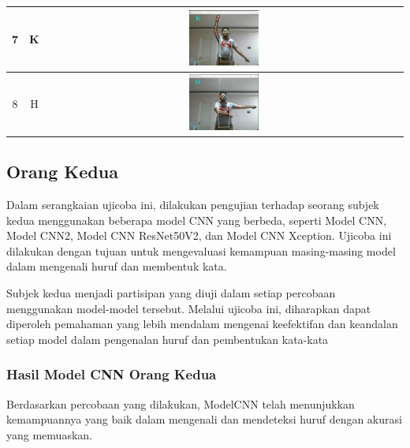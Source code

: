 \begin{table}[h]
\begin{tabular}{|c|c|c|}
			\hline
			7 & K & \includegraphics[width=0.2\textwidth]{gambar/bener/HurufK_ModelCNNXception_Dawe.png} \\
			\hline
			8 & H & \includegraphics[width=0.2\textwidth]{gambar/bener/HurufH_ModelCNNXception_Dawe.png} \\
			\hline
			\end{tabular}
			\end{table}


\subsection{Orang Kedua}

Dalam serangkaian ujicoba ini, dilakukan pengujian terhadap seorang subjek kedua menggunakan beberapa model CNN yang berbeda, seperti Model CNN, Model CNN2, Model CNN ResNet50V2, dan Model CNN Xception. Ujicoba ini dilakukan dengan tujuan untuk mengevaluasi kemampuan masing-masing model dalam mengenali huruf dan membentuk kata.

Subjek kedua menjadi partisipan yang diuji dalam setiap percobaan menggunakan model-model tersebut. Melalui ujicoba ini, diharapkan dapat diperoleh pemahaman yang lebih mendalam mengenai keefektifan dan keandalan setiap model dalam pengenalan huruf dan pembentukan kata-kata

\subsubsection*{Hasil Model CNN Orang Kedua}

Berdasarkan percobaan yang dilakukan, ModelCNN telah menunjukkan kemampuannya yang baik dalam mengenali dan mendeteksi huruf dengan akurasi yang memuaskan.

